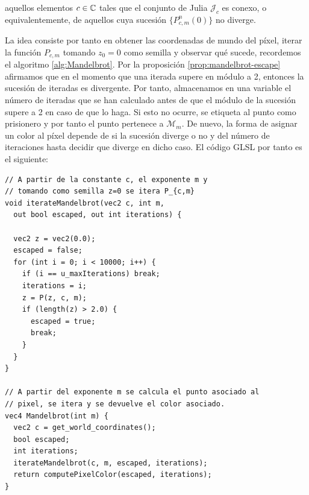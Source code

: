  aquellos elementos $c\in\mathbb{C}$ tales que el conjunto de Julia $\mathcal{J}_c$ es conexo, o equivalentemente, de aquellos cuya sucesión $\{P_{c,m}^n(0)\}$ no diverge.

La idea consiste por tanto en obtener las coordenadas de mundo del píxel, iterar la función $P_{c,m}$ tomando $z_0=0$ como semilla y observar qué sucede, recordemos el algoritmo \ref{alg:Mandelbrot}. Por la proposición \ref{prop:mandelbrot-escape} afirmamos que en el momento que una iterada supere en módulo a 2, entonces la sucesión de iteradas es divergente. Por tanto, almacenamos en una variable el número de iteradas que se han calculado antes de que el módulo de la sucesión supere a 2 en caso de que lo haga. Si esto no ocurre, se etiqueta al punto como prisionero y por tanto el punto pertenece a $\mathcal{M}_m$. De nuevo, la forma de asignar un color al píxel depende de si la sucesión diverge o no y del número de iteraciones hasta decidir que diverge en dicho caso. El código GLSL por tanto es el siguiente:

\begin{lstlisting}
// A partir de la constante c, el exponente m y 
// tomando como semilla z=0 se itera P_{c,m} 
void iterateMandelbrot(vec2 c, int m, 
  out bool escaped, out int iterations) {
    
  vec2 z = vec2(0.0);
  escaped = false;
  for (int i = 0; i < 10000; i++) {
    if (i == u_maxIterations) break;
    iterations = i;
    z = P(z, c, m);
    if (length(z) > 2.0) {
      escaped = true;
      break;
    }
  }
}

// A partir del exponente m se calcula el punto asociado al
// pixel, se itera y se devuelve el color asociado.
vec4 Mandelbrot(int m) {
  vec2 c = get_world_coordinates();
  bool escaped;
  int iterations;
  iterateMandelbrot(c, m, escaped, iterations);
  return computePixelColor(escaped, iterations);
}
\end{lstlisting}

